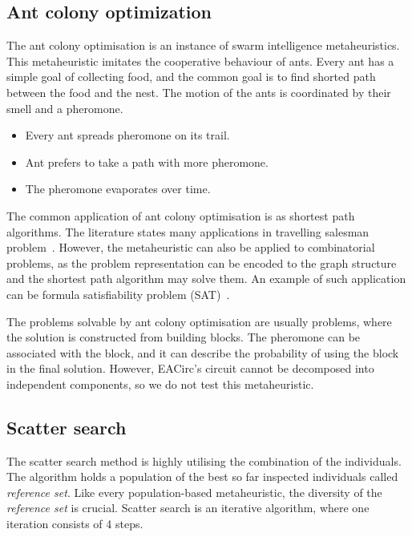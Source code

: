 \documentclass[
  print, %
  Table,   %
  nolof,     %
  nolot,     %
  11pt, %
  oneside  %
]{fithesis3}
\begin{document}
\subsection{Ant colony optimization}
\label{subsec:opt-popul-aco}

The ant colony optimisation is an instance of swarm intelligence metaheuristics. This metaheuristic imitates the cooperative behaviour of ants. Every ant has a simple goal of collecting food, and the common goal is to find shorted path between the food and the nest. The motion of the ants is coordinated by their smell and a pheromone.

\begin{itemize}
    \item Every ant spreads pheromone on its trail.
    \item Ant prefers to take a path with more pheromone.
    \item The pheromone evaporates over time.
\end{itemize}

The common application of ant colony optimisation is as shortest path algorithms. The literature states many applications in travelling salesman problem~\cite{dorigo1997ant}. However, the metaheuristic can also be applied to combinatorial problems, as the problem representation can be encoded to the graph structure and the shortest path algorithm may solve them. An example of such application can be formula satisfiability problem (SAT)~\cite{moritz2010solving}.

The problems solvable by ant colony optimisation are usually problems, where the solution is constructed from building blocks. The pheromone can be associated with the block, and it can describe the probability of using the block in the final solution. However, EACirc's circuit cannot be decomposed into independent components, so we do not test this metaheuristic.

\subsection{Scatter search}
\label{subsec:opt-popul-scatter}

The scatter search method is highly utilising the combination of the individuals. The algorithm holds a population of the best so far inspected individuals called \textit{reference set}. Like every population-based metaheuristic, the diversity of the \textit{reference set} is crucial. Scatter search is an iterative algorithm, where one iteration consists of 4 steps.
\end{document}
